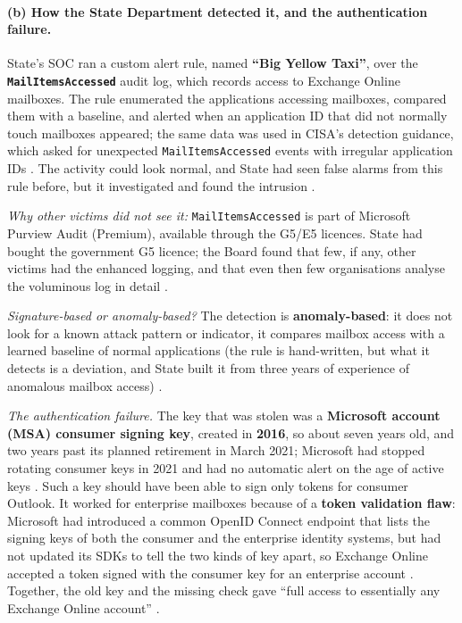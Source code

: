 \documentclass[11pt,a4paper]{article}
\newcommand{\code}[1]{\texttt{#1}}
\begin{document}
\paragraph{(b) How the State Department detected it, and the authentication failure.} State's SOC ran a custom alert rule,
named \textbf{``Big Yellow Taxi''}, over the \textbf{\code{MailItemsAccessed}} audit log, which records access to Exchange Online
mailboxes. The rule enumerated the applications accessing mailboxes, compared them with a baseline, and alerted when an
application ID that did not normally touch mailboxes appeared; the same data was used in CISA's detection guidance, which
asked for unexpected \code{MailItemsAccessed} events with irregular application IDs \cite{csrb,cisa193}. The activity could look
normal, and State had seen false alarms from this rule before, but it investigated and found the intrusion \cite{csrb}.

\emph{Why other victims did not see it:} \code{MailItemsAccessed} is part of Microsoft Purview Audit (Premium), available through
the G5/E5 licences. State had bought the government G5 licence; the Board found that few, if any, other victims had the
enhanced logging, and that even then few organisations analyse the voluminous log in detail \cite{csrb}.

\emph{Signature-based or anomaly-based?} The detection is \textbf{anomaly-based}: it does not look for a known attack pattern
or indicator, it compares mailbox access with a learned baseline of normal applications (the rule is hand-written, but what it
detects is a deviation, and State built it from three years of experience of anomalous mailbox access) \cite{csrb}.

\emph{The authentication failure.} The key that was stolen was a \textbf{Microsoft account (MSA) consumer signing key},
created in \textbf{2016}, so about seven years old, and two years past its planned retirement in March 2021; Microsoft had stopped
rotating consumer keys in 2021 and had no automatic alert on the age of active keys \cite{csrb}. Such a key should have been
able to sign only tokens for consumer Outlook. It worked for enterprise mailboxes because of a \textbf{token validation flaw}:
Microsoft had introduced a common OpenID Connect endpoint that lists the signing keys of both the consumer and the enterprise
identity systems, but had not updated its SDKs to tell the two kinds of key apart, so Exchange Online accepted a token signed
with the consumer key for an enterprise account \cite{csrb,mskey}. Together, the old key and the missing check gave
``full access to essentially any Exchange Online account'' \cite{csrb}.
\end{document}

